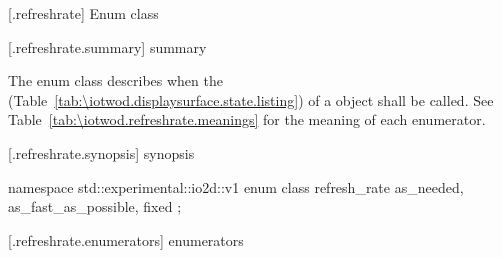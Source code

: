  [\iotwod.refreshrate] {Enum class }

 [\iotwod.refreshrate.summary] { summary}

\pnum
The  enum class describes when the  (Table~\ref{tab:\iotwod.displaysurface.state.listing}) of a  object shall be called. See Table~\ref{tab:\iotwod.refreshrate.meanings} for the meaning of each \tcode{} enumerator.

 [\iotwod.refreshrate.synopsis] { synopsis}

\begin{codeblock}
namespace std::experimental::io2d::v1 {
  enum class refresh_rate {
    as_needed,
    as_fast_as_possible,
    fixed
  };
}
\end{codeblock}

 [\iotwod.refreshrate.enumerators] { enumerators}

